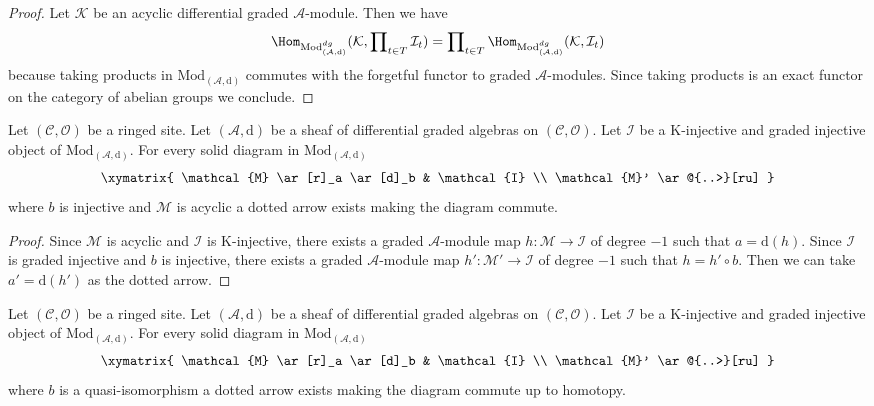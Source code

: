 \begin{proof}
Let $\mathcal{K}$ be an acyclic differential graded $\mathcal{A}$-module.
Then we have
$$
\Hom_{\text{Mod}^{dg}_{(\mathcal{A}, \text{d})}}(\mathcal{K},
\prod\nolimits_{t \in T} \mathcal{I}_t)
=
\prod\nolimits_{t \in T}
\Hom_{\text{Mod}^{dg}_{(\mathcal{A}, \text{d})}}(\mathcal{K}, \mathcal{I}_t)
$$
because taking products in $\text{Mod}_{(\mathcal{A}, \text{d})}$
commutes with the forgetful functor to graded $\mathcal{A}$-modules.
Since taking products is an exact functor on the category of abelian groups
we conclude.
\end{proof}

\begin{lemma}
\label{lemma-first-property-dg-injective}
Let $(\mathcal{C}, \mathcal{O})$ be a ringed site.
Let $(\mathcal{A}, \text{d})$
be a sheaf of differential graded algebras on $(\mathcal{C}, \mathcal{O})$.
Let $\mathcal{I}$ be a K-injective and graded injective
object of $\text{Mod}_{(\mathcal{A}, \text{d})}$.
For every solid diagram in $\text{Mod}_{(\mathcal{A}, \text{d})}$
$$
\xymatrix{
\mathcal{M} \ar[r]_a \ar[d]_b & \mathcal{I} \\
\mathcal{M}' \ar@{..>}[ru]
}
$$
where $b$ is injective and $\mathcal{M}$ is acyclic
a dotted arrow exists making the diagram commute.
\end{lemma}

\begin{proof}
Since $\mathcal{M}$ is acyclic and $\mathcal{I}$ is K-injective,
there exists a graded $\mathcal{A}$-module map
$h : \mathcal{M} \to \mathcal{I}$ of degree $-1$
such that $a = \text{d}(h)$. Since $\mathcal{I}$ is graded injective
and $b$ is injective, there exists a graded $\mathcal{A}$-module
map $h' : \mathcal{M}' \to \mathcal{I}$ of degree $-1$
such that $h = h' \circ b$. Then we can take $a' = \text{d}(h')$
as the dotted arrow.
\end{proof}

\begin{lemma}
\label{lemma-second-property-dg-injective}
Let $(\mathcal{C}, \mathcal{O})$ be a ringed site. Let
$(\mathcal{A}, \text{d})$ be a sheaf of differential graded algebras on
$(\mathcal{C}, \mathcal{O})$. Let $\mathcal{I}$ be a
K-injective and graded injective
object of $\text{Mod}_{(\mathcal{A}, \text{d})}$.
For every solid diagram in $\text{Mod}_{(\mathcal{A}, \text{d})}$
$$
\xymatrix{
\mathcal{M} \ar[r]_a \ar[d]_b & \mathcal{I} \\
\mathcal{M}' \ar@{..>}[ru]
}
$$
where $b$ is a quasi-isomorphism a dotted arrow exists making the
diagram commute up to homotopy.
\end{lemma}

